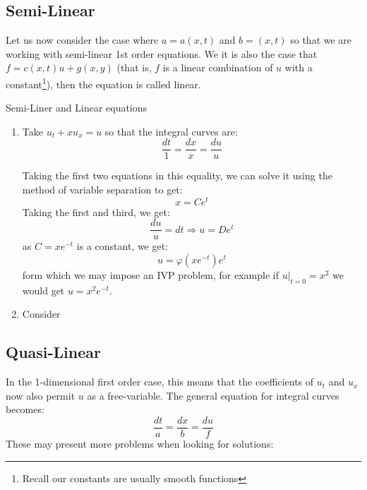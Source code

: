 \documentclass{book}
\renewcommand{\phi}{\varphi}
\newcommand{\Rw}{\Rightarrow}
\begin{document}
\subsection*{Semi-Linear}

Let us now consider the case where $a = a(x,t)$ and $b = (x,t)$ so that we are working with semi-linear
1st order equations. We it is also the case that $f = c(x,t)u + g(x,y)$ (that is, $f$ is a linear
combination of $u$ with a constant\footnote{Recall our constants are usually smooth functions}), then the
equation is called linear.

\begin{example}{Semi-Liner and Linear equations}{}
	\begin{enumerate}
		\item Take $u_t + xu_x = u$ so that the integral curves are:
			\[
				\frac{dt}{1} = \frac{dx}{x} = \frac{du}{u}
			\]

			Taking the first two equations in this equality, we can solve it using the method of variable
			separation to get:
			\[
				x = Ce^t
			\]
			Taking the first and third, we get:
			\[
				\frac{du}{u} = dt \Rw u=De^t
			\]
			as $C = xe^{-t}$ is a constant, we get:
			\[
				u = \phi(xe^{-t})e^t
			\]
			form which we may impose an IVP problem, for example if $u|_{t=0} = x^2$ we would get $u
			= x^2e^{-t}$.
		\item Consider
	\end{enumerate}
\end{example}

\subsection*{Quasi-Linear}

In the 1-dimensional first order case, this means that the coefficients of $u_t$ and $u_x$ now also permit $u$
as a free-variable. The general equation for integral curves becomes:
\[
	\frac{dt}{a} = \frac{dx}{b} = \frac{du}{f}
\]
These may present more problems when looking for solutions:
\end{document}
